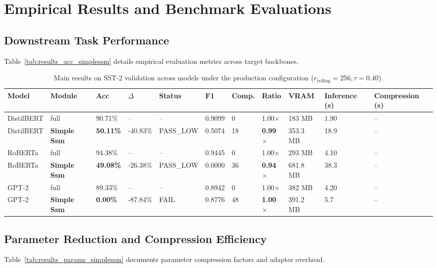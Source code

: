 \section{Empirical Results and Benchmark Evaluations}

\subsection{Downstream Task Performance}
Table~\ref{tab:results_acc_simplessm} details empirical evaluation metrics across target backbones.

\begin{table}[t]
\centering
\small
\begin{tabular}{lllllllllll}
\toprule
\textbf{Model} & \textbf{Module} & \textbf{Acc} & \textbf{$\Delta$} & \textbf{Status} & \textbf{F1} & \textbf{Comp.} & \textbf{Ratio} & \textbf{VRAM} & \textbf{Inference (s)} & \textbf{Compression (s)} \\
\midrule
DistilBERT & full & 90.71\% & -- & -- & 0.9099 & 0 & 1.00$\times$ & 183 MB & 1.90 & -- \\
DistilBERT & \textbf{Simple Ssm} & \textbf{50.11\%} & -40.83\% & PASS_LOW & 0.5074 & 18 & \textbf{0.99$\times$} & 353.3 MB & 18.9 & -- \\
RoBERTa & full & 94.38\% & -- & -- & 0.9445 & 0 & 1.00$\times$ & 293 MB & 4.10 & -- \\
RoBERTa & \textbf{Simple Ssm} & \textbf{49.08\%} & -26.38\% & PASS_LOW & 0.0000 & 36 & \textbf{0.94$\times$} & 681.8 MB & 38.3 & -- \\
GPT-2 & full & 89.33\% & -- & -- & 0.8942 & 0 & 1.00$\times$ & 382 MB & 4.20 & -- \\
GPT-2 & \textbf{Simple Ssm} & \textbf{0.00\%} & -87.84\% & FAIL & 0.8776 & 48 & \textbf{1.00$\times$} & 391.2 MB & 5.7 & -- \\
\bottomrule
\end{tabular}
\caption{Main results on SST-2 validation across models under the production configuration ($r_{\mathrm{ceiling}}=256, \tau=0.40$).}
\label{tab:main_sst2}
\end{table}

\subsection{Parameter Reduction and Compression Efficiency}
Table~\ref{tab:results_params_simplessm} documents parameter compression factors and adapter overhead.

